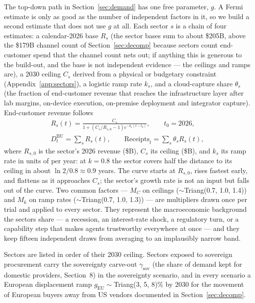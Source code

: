 \documentclass[11pt,letterpaper]{article}
\begin{document}
The top-down path in Section~\ref{sec:demand} has one free parameter, $g$. A Fermi estimate is only as good as the number of independent factors in it, so we build a second estimate that does not use $g$ at all. Each sector $s$ is a chain of four estimates: a calendar-2026 base $R_s$ (the sector bases sum to about \$205B, above the \$179B channel count of Section~\ref{sec:decomp} because sectors count end-customer spend that the channel count nets out; if anything this is generous to the build-out, and the base is not independent evidence --- the ceilings and ramps are), a 2030 ceiling $C_s$ derived from a physical or budgetary constraint (Appendix~\ref{app:sectors}), a logistic ramp rate $k_s$, and a cloud-capture share $\theta_s$ (the fraction of end-customer revenue that reaches the infrastructure layer after lab margins, on-device execution, on-premise deployment and integrator capture). End-customer revenue follows
\begin{equation}
\begin{gathered}R_s(t)=\frac{C_s}{1+\left(C_s/R_{s,0}-1\right)e^{-k_s(t-t_0)}},\qquad t_0=2026,\\ D^{\text{BU}}_t=\sum_s R_s(t),\qquad \text{Receipts}_t=\sum_s\theta_s R_s(t),\end{gathered}
\end{equation}
where $R_{s,0}$ is the sector's 2026 revenue (\$B), $C_s$ its ceiling (\$B), and $k_s$ its ramp rate in units of per year: at $k=0.8$ the sector covers half the distance to its ceiling in about $\ln 2/0.8\approx0.9$ years. The curve starts at $R_{s,0}$, rises fastest early, and flattens as it approaches $C_s$; the sector's growth rate is not an input but falls out of the curve.
Two common factors --- $M_C$ on ceilings ($\sim$Triang(0.7, 1.0, 1.4)) and $M_k$ on ramp rates ($\sim$Triang(0.7, 1.0, 1.3)) --- are multipliers drawn once per trial and applied to every sector. They represent the macroeconomic background the sectors share --- a recession, an interest-rate shock, a regulatory turn, or a capability step that makes agents trustworthy everywhere at once --- and they keep fifteen independent draws from averaging to an implausibly narrow band.

Sectors are listed in order of their 2030 ceiling. Sectors exposed to sovereign procurement carry the sovereignty carve-out $\gamma_{\text{sov}}$ (the share of demand kept for domestic providers, Section~8) in the sovereignty scenario, and in every scenario a European displacement ramp $g_{\text{EU}}\sim$Triang(3, 5, 8)\% by 2030 for the movement of European buyers away from US vendors documented in Section~\ref{sec:decomp}.
\end{document}
